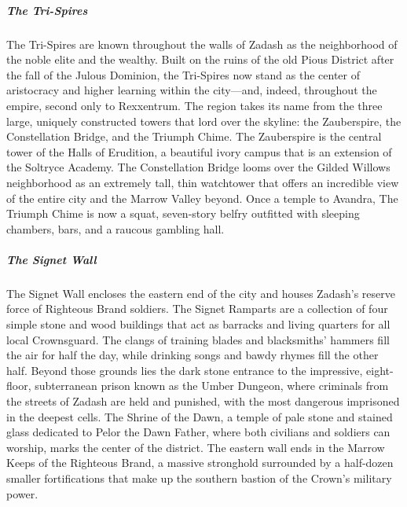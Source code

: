 \documentclass[10pt,a4paper,twoside,bg=print,twocolumn,openany,nodeprecatedcode]{dndbook}
\begin{document}
\subparagraph{The Tri-Spires}
The Tri-Spires are known throughout the walls of Zadash as the neighborhood of the noble elite and the wealthy. Built on the ruins of the old Pious District after the fall of the Julous Dominion, the Tri-Spires now stand as the center of aristocracy and higher learning within the city—and, indeed, throughout the empire, second only to Rexxentrum. The region takes its name from the three large, uniquely constructed towers that lord over the skyline: the Zauberspire, the Constellation Bridge, and the Triumph Chime. The Zauberspire is the central tower of the Halls of Erudition, a beautiful ivory campus that is an extension of the Soltryce Academy. The Constellation Bridge looms over the Gilded Willows neighborhood as an extremely tall, thin watchtower that offers an incredible view of the entire city and the Marrow Valley beyond. Once a temple to Avandra, The Triumph Chime is now a squat, seven-story belfry outfitted with sleeping chambers, bars, and a raucous gambling hall.

\subparagraph{The Signet Wall}
The Signet Wall encloses the eastern end of the city and houses Zadash's reserve force of Righteous Brand soldiers. The Signet Ramparts are a collection of four simple stone and wood buildings that act as barracks and living quarters for all local Crownsguard. The clangs of training blades and blacksmiths' hammers fill the air for half the day, while drinking songs and bawdy rhymes fill the other half. Beyond those grounds lies the dark stone entrance to the impressive, eight-floor, subterranean prison known as the Umber Dungeon, where criminals from the streets of Zadash are held and punished, with the most dangerous imprisoned in the deepest cells. The Shrine of the Dawn, a temple of pale stone and stained glass dedicated to Pelor the Dawn Father, where both civilians and soldiers can worship, marks the center of the district. The eastern wall ends in the Marrow Keeps of the Righteous Brand, a massive stronghold surrounded by a half-dozen smaller fortifications that make up the southern bastion of the Crown's military power.
\end{document}
